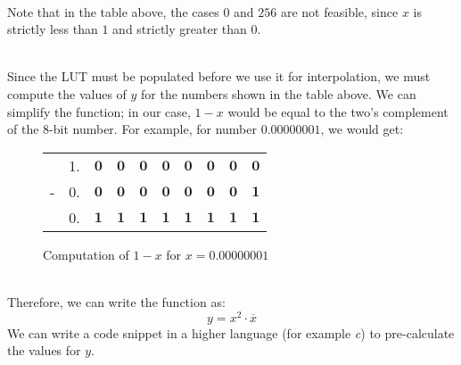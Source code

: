 \documentclass{article}
\begin{document}
    ~\\Note that in the table above, the cases $ 0 $ and $ 256 $ are not feasible, since $x$ is strictly less than $1$ and strictly greater than $0$.
    
    ~\\ Since the LUT must be populated before we use it for interpolation, we must compute the values of $ y $ for the numbers shown in the table above. We can simplify the function; in our case, $1 - x$ would be equal to the two's complement of the $8$-bit number. For example, for number $0.00000001$, we would get:
    
    \begin{figure}[h!]
        \centering
        \begin{tabular}{c*{9}{@{\,}c}}
          & 1. & $ \boldsymbol{0} $ & $ \boldsymbol{0} $ & $ \boldsymbol{0} $ & $ \boldsymbol{0} $ & $ \boldsymbol{0} $ & $ \boldsymbol{0} $ & $ \boldsymbol{0} $ & $ \boldsymbol{0} $ \\
        - & 0. & $ \boldsymbol{0} $ & $ \boldsymbol{0} $ & $ \boldsymbol{0} $ & $ \boldsymbol{0} $ & $ \boldsymbol{0} $ & $ \boldsymbol{0} $ & $ \boldsymbol{0} $ & $ \boldsymbol{1} $ \\
        \hline
          & 0. & $ \boldsymbol{1} $ & $ \boldsymbol{1} $ & $ \boldsymbol{1} $ & $ \boldsymbol{1} $ & $ \boldsymbol{1} $ & $ \boldsymbol{1} $ & $ \boldsymbol{1} $ & $ \boldsymbol{1} $ \\
        \end{tabular}
        \caption{Computation of $1 - x$ for $x=0.00000001$}
        \label{fig:my_label}
    \end{figure}
    
    ~\\Therefore, we can write the function as:
    \begin{equation}
        y = x^2 \cdot \overline{x}
    \end{equation}
    We can write a code snippet in a higher language (for example \textsl{c}) to pre-calculate the values for $y$.
    
    \newpage
\end{document}
